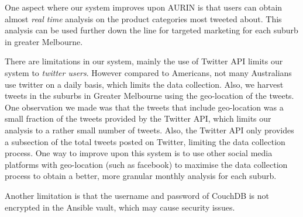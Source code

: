 \documentclass[parskip=full, 11pt]{article}
\begin{document}
One aspect where our system improves upon AURIN is that users can obtain almost \emph{real time} analysis on the product categories most tweeted about. This analysis can be used further down the line for targeted marketing for each suburb in greater Melbourne.

There are limitations in our system, mainly the use of Twitter API limits our system to \emph{twitter users}. However compared to Americans, not many Australians use twitter on a daily basis, which limits the data collection. Also, we harvest tweets in the suburbs in Greater Melbourne using the geo-location of the tweets. One observation we made was that the tweets that include geo-location was a small fraction of the tweets provided by the Twitter API, which limits our analysis to a rather small number of tweets. Also, the Twitter API only provides a subsection of the total tweets posted on Twitter, limiting the data collection process. One way to improve upon this system is to use other social media platforms with geo-location (such as facebook) to maximise the data collection process to obtain a better, more granular monthly analysis for each suburb. 

Another limitation is that the username and password of CouchDB is not encrypted in the Ansible vault, which may cause security issues.



\end{document}
